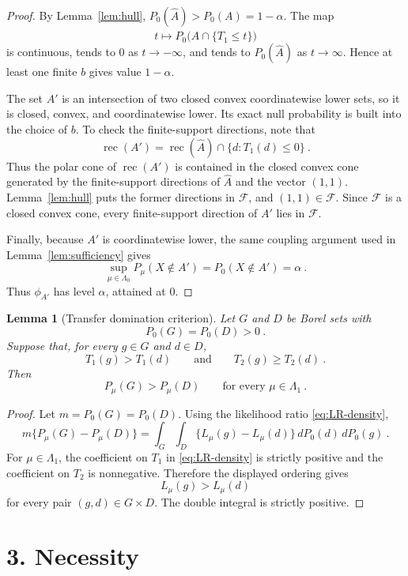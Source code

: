 \documentclass[12pt]{article}
\newtheorem{lemma}{Lemma}
\theoremstyle{remark}
\begin{document}
\begin{proof}
By Lemma~\ref{lem:hull}, $P_0(\widehat A)>P_0(A)=1-\alpha$.  The map
\[
t\mapsto P_0\big(\widehat A\cap\{T_1\le t\}\big)
\]
is continuous, tends to $0$ as $t\to-\infty$, and tends to $P_0(\widehat A)$ as $t\to\infty$.  Hence at least one finite $b$ gives value $1-\alpha$.

The set $A'$ is an intersection of two closed convex coordinatewise lower sets, so it is closed, convex, and coordinatewise lower.  Its exact null probability is built into the choice of $b$.  To check the finite-support directions, note that
\[
\operatorname{rec}(A')=\operatorname{rec}(\widehat A)\cap\{d:T_1(d)\le0\}~.
\]
Thus the polar cone of $\operatorname{rec}(A')$ is contained in the closed convex cone generated by the finite-support directions of $\widehat A$ and the vector $(1,1)$.  Lemma~\ref{lem:hull} puts the former directions in $\mathcal F$, and $(1,1)\in\mathcal F$.  Since $\mathcal F$ is a closed convex cone, every finite-support direction of $A'$ lies in $\mathcal F$.

Finally, because $A'$ is coordinatewise lower, the same coupling argument used in Lemma~\ref{lem:sufficiency} gives
\[
\sup_{\mu\in\Lambda_0}P_\mu(X\notin A')=P_0(X\notin A')=\alpha~.
\]
Thus $\phi_{A'}$ has level $\alpha$, attained at $0$.
\end{proof}

\begin{lemma}[Transfer domination criterion]\label{lem:transfer}
Let $G$ and $D$ be Borel sets with
\[
P_0(G)=P_0(D)>0~.
\]
Suppose that, for every $g\in G$ and $d\in D$,
\[
T_1(g)>T_1(d)
\qquad\text{and}\qquad
T_2(g)\ge T_2(d)~.
\]
Then
\[
P_\mu(G)>P_\mu(D)
\qquad\text{for every }\mu\in\Lambda_1~.
\]
\end{lemma}

\begin{proof}
Let $m=P_0(G)=P_0(D)$.  Using the likelihood ratio \eqref{eq:LR-density},
\[
m\{P_\mu(G)-P_\mu(D)\}
=
\int_G\int_D \{L_\mu(g)-L_\mu(d)\}\,dP_0(d)\,dP_0(g)~.
\]
For $\mu\in\Lambda_1$, the coefficient on $T_1$ in \eqref{eq:LR-density} is strictly positive and the coefficient on $T_2$ is nonnegative.  Therefore the displayed ordering gives
\[
L_\mu(g)>L_\mu(d)
\]
for every pair $(g,d)\in G\times D$.  The double integral is strictly positive.
\end{proof}

\section*{3. Necessity}
\end{document}
